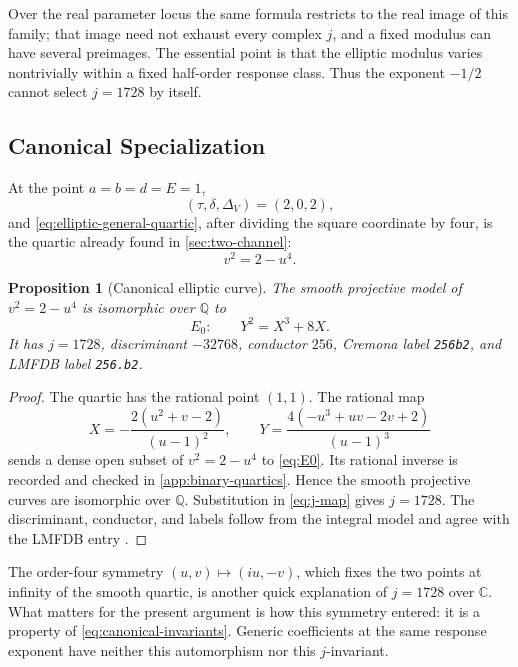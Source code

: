 \documentclass[11pt,reqno]{amsart}
\newtheorem{proposition}[theorem]{Proposition}
\theoremstyle{remark}
\newcommand{\C}{\mathbb C}
\newcommand{\Q}{\mathbb Q}
\begin{document}
Over the real parameter locus the same formula restricts to the real image
of this family; that image need not exhaust every complex $j$, and a fixed
modulus can have several preimages.  The essential point is that the
elliptic modulus varies nontrivially within a fixed half-order response
class.  Thus the exponent $-1/2$ cannot select $j=1728$ by itself.

\subsection{Canonical Specialization}

At the point $a=b=d=E=1$,
\begin{equation}\label{eq:canonical-invariants}
 (\tau,\delta,\Delta_V)=(2,0,2),
\end{equation}
and \eqref{eq:elliptic-general-quartic}, after dividing the square coordinate
by four, is the quartic already found in \cref{sec:two-channel}:
\[
 v^2=2-u^4.
\]

\begin{proposition}[Canonical elliptic curve]\label{prop:canonical-curve}
The smooth projective model of $v^2=2-u^4$ is isomorphic over $\Q$ to
\begin{equation}\label{eq:E0}
 E_0:\qquad Y^2=X^3+8X.
\end{equation}
It has $j=1728$, discriminant $-32768$, conductor $256$, Cremona label
\texttt{256b2}, and LMFDB label \texttt{256.b2}.
\end{proposition}

\begin{proof}
The quartic has the rational point $(1,1)$.  The rational map
\begin{equation}\label{eq:canonical-forward}
 X=-\frac{2(u^2+v-2)}{(u-1)^2},\qquad
 Y=\frac{4(-u^3+uv-2v+2)}{(u-1)^3}
\end{equation}
sends a dense open subset of $v^2=2-u^4$ to \eqref{eq:E0}.  Its rational
inverse is recorded and checked in \cref{app:binary-quartics}.  Hence the
smooth projective curves are isomorphic over $\Q$.  Substitution in
\eqref{eq:j-map} gives $j=1728$.  The discriminant, conductor, and labels
follow from the integral model and agree with the LMFDB entry
\cite{LMFDB256b2}.
\end{proof}

The order-four symmetry $(u,v)\mapsto(iu,-v)$, which fixes the two points at
infinity of the smooth quartic, is another quick explanation of $j=1728$ over
$\C$.  What matters for the present argument is how this symmetry entered: it
is a property of \eqref{eq:canonical-invariants}.
Generic coefficients at the same response exponent have neither this
automorphism nor this $j$-invariant.
\end{document}
